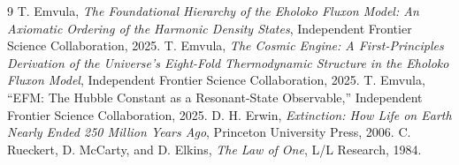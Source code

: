 \documentclass[11pt, twoside]{article}
\begin{document}

\begin{thebibliography}{9}
 T. Emvula, \textit{The Foundational Hierarchy of the Eholoko Fluxon Model: An Axiomatic Ordering of the Harmonic Density States}, Independent Frontier Science Collaboration, 2025.
 T. Emvula, \textit{The Cosmic Engine: A First-Principles Derivation of the Universe's Eight-Fold Thermodynamic Structure in the Eholoko Fluxon Model}, Independent Frontier Science Collaboration, 2025.
 T. Emvula, ``EFM: The Hubble Constant as a Resonant-State Observable,'' Independent Frontier Science Collaboration, 2025.
 D. H. Erwin, \textit{Extinction: How Life on Earth Nearly Ended 250 Million Years Ago}, Princeton University Press, 2006.
 C. Rueckert, D. McCarty, and D. Elkins, \textit{The Law of One}, L/L Research, 1984.
\end{thebibliography}
\end{document}
